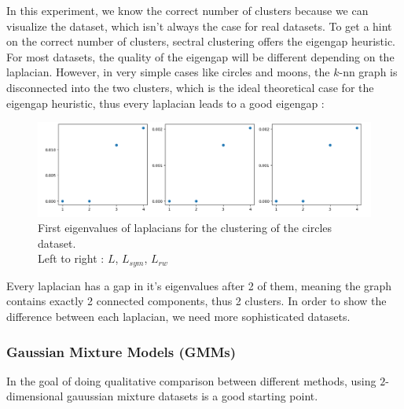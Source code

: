 \documentclass[a4paper,12pt]{article}
\theoremstyle{definition}
\theoremstyle{plain}
\begin{document}
In this experiment, we know the correct number of clusters because we can visualize the dataset, which isn't always the case for real datasets. To get a hint on the correct number of clusters, sectral clustering offers the eigengap heuristic. For most datasets, the quality of the eigengap will be different depending on the laplacian. However, in very simple cases like circles and moons, the $k$-nn graph is disconnected into the two clusters, which is the ideal theoretical case for the eigengap heuristic, thus every laplacian leads to a good eigengap :


\begin{figure}[H]
	\captionsetup{justification=centering}
	\centering
	\includegraphics[width=1.1\linewidth]{figures/Fig_E1_circles}
	\caption{First eigenvalues of laplacians for the clustering of the circles dataset. \\ Left to right : $L$, $L_{sym}$, $L_{rw}$}
	\label{fig:fige1circles}
\end{figure}

Every laplacian has a gap in it's eigenvalues after 2 of them, meaning the graph contains exactly 2 connected components, thus 2 clusters.
In order to show the difference between each laplacian, we need more sophisticated datasets.

\subsubsection{Gaussian Mixture Models (GMMs)}
In the goal of doing qualitative comparison between different methods, using $2$-dimensional gauussian mixture datasets is a good starting point. 
\end{document}
